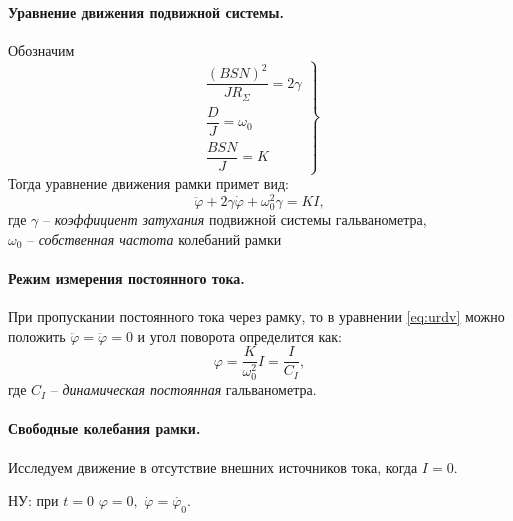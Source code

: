 \documentclass[a4paper, 12pt, twoside]{article}
\begin{document}
\paragraph{Уравнение движения подвижной системы.}
Обозначим
\begin{equation}\label{eq:obz}
\left.
\begin{aligned}
\dfrac{(BSN)^2}{JR_\Sigma} = 2\gamma\\
\dfrac{D}{J} = \omega_0\\
\dfrac{BSN}{J} = K
\end{aligned}
\right\}
\end{equation}
Тогда уравнение движения рамки примет вид:
\begin{equation}\label{eq:urdv}
\ddot{\varphi} + 2\gamma\dot{\varphi} + \omega_0^2\gamma = KI,
\end{equation}
где $\gamma$ --\textit{ коэффициент затухания} подвижной системы гальванометра,\\ $\omega_0$ -- \textit{собственная частота} колебаний рамки

\paragraph{Режим измерения постоянного тока.}
При пропускании постоянного тока через рамку, то в уравнении \eqref{eq:urdv} можно положить $\ddot{\varphi} = \ddot{\varphi} = 0$ и угол поворота определится как:
\begin{equation}
\varphi = \dfrac{K}{\omega_0^2}I = \dfrac{I}{C_I},
\end{equation}
где $C_I$ -- \textit{динамическая постоянная} гальванометра.

\paragraph{Свободные колебания рамки.} Исследуем движение в отсутствие внешних источников тока, когда $I = 0$.

НУ:\hspace{10pt} при $t = 0$ \hspace{10pt} $\varphi = 0,$ \hspace{10pt} $\dot{\varphi} = \dot{\varphi_0}$.
\end{document}
